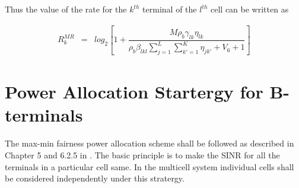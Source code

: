 \documentclass[10pt, a4paper, twoside,fleqn]{article}
\begin{document}
Thus the value of the rate for the $k^{th}$ terminal of the $l^{th}$ cell can be written as

\begin{eqnarray}\label{eqn:rateot}
	R_k^{MR} &=& log_2\left[1+ \dfrac{M\rho_b\gamma_{lk}\eta_{lk}}{\rho_b\beta_{lkl}\sum\limits_{j=1}^{L} \sum\limits_{k' = 1}^{K}\eta_{jk'}
				+V_6
				+1}\right]
\end{eqnarray}

\section{Power Allocation Startergy for B-terminals}
  The max-min fairness power allocation scheme shall be followed as described in Chapter 5 and 6.2.5 in \cite{bib:MassiveMimoBook}. The basic principle is to make the SINR for all the terminals in a particular cell same. In the multicell system individual cells shall be considered independently under this stratergy. 
\end{document}
